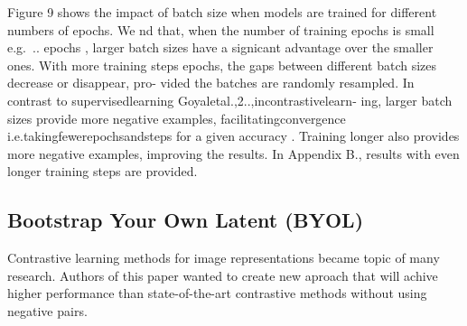 \documentclass[
]{krantz}
\begin{document}
Figure 9 shows the impact of batch size when models are trained for different numbers of epochs. We nd that, when the number of training epochs is small e.g.~.. epochs , larger batch sizes have a signicant advantage over the smaller ones. With more training steps epochs, the gaps between different batch sizes decrease or disappear, pro- vided the batches are randomly resampled. In contrast to supervisedlearning Goyaletal.,2..,incontrastivelearn- ing, larger batch sizes provide more negative examples, facilitatingconvergence i.e.takingfewerepochsandsteps for a given accuracy . Training longer also provides more negative examples, improving the results. In Appendix B., results with even longer training steps are provided.

\hypertarget{bootstrap-your-own-latent-byol}{%
\subsection{Bootstrap Your Own Latent (BYOL)}\label{bootstrap-your-own-latent-byol}}

Contrastive learning methods for image representations became topic of many research. Authors of this paper wanted to create new aproach that will achive higher performance than state-of-the-art contrastive methods without using negative pairs.
\end{document}

